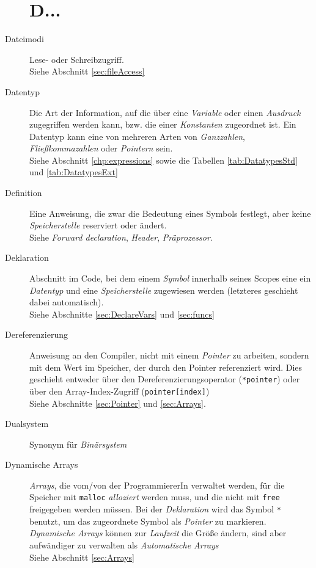 \begin{appendices}
\begin{description}
\section*{D...}
\item[Dateimodi] Lese- oder Schreibzugriff.\\
	Siehe Abschnitt \ref{sec:fileAccess}
\item[Datentyp] Die Art der Information, auf die über eine \emph{Variable} oder einen \emph{Ausdruck} 
	zugegriffen werden kann, bzw. die einer \emph{Konstanten} zugeordnet ist. Ein Datentyp kann eine von
	mehreren Arten von \emph{Ganzzahlen}, \emph{Fließkommazahlen} oder \emph{Pointern} sein.\\
	Siehe Abschnitt \ref{chp:expressions} sowie die Tabellen \ref{tab:DatatypesStd} und
	\ref{tab:DatatypesExt}
\item[Definition] Eine Anweisung, die zwar die Bedeutung eines Symbols festlegt, aber keine
	\emph{Speicherstelle} reserviert oder ändert.\\
	Siehe \emph{Forward declaration}, \emph{Header}, \emph{Präprozessor}.
\item[Deklaration] Abschnitt im Code, bei dem einem \emph{Symbol} innerhalb seines Scopes eine
	ein \emph{Datentyp} und eine \emph{Speicherstelle} zugewiesen werden (letzteres geschieht dabei
	automatisch).\\
	Siehe Abschnitte \ref{sec:DeclareVars} und \ref{sec:funcs}
\item[Dereferenzierung] Anweisung an den Compiler, nicht mit einem \emph{Pointer} zu arbeiten, sondern
	mit dem Wert im Speicher, der durch den Pointer referenziert wird. Dies geschieht entweder über den
	Dereferenzierungsoperator (\texttt{*pointer}) oder über den Array-Index-Zugriff
	(\texttt{pointer[index]})\\
	Siehe Abschnitte \ref{sec:Pointer} und \ref{sec:Arrays}.
\item[Dualsystem] Synonym für \emph{Binärsystem}
\item[Dynamische Arrays] \emph{Arrays}, die vom/von der ProgrammiererIn verwaltet werden, \ie für die
	Speicher mit \texttt{malloc} \emph{alloziert} werden muss, und die nicht mit \texttt{free}
	freigegeben werden müssen. Bei der \emph{Deklaration} wird das Symbol \texttt{*} benutzt, um
	das zugeordnete Symbol als \emph{Pointer} zu markieren.\\
	\emph{Dynamische Arrays} können zur \emph{Laufzeit} die Größe ändern, sind aber aufwändiger zu
	verwalten als \emph{Automatische Arrays}\\
	Siehe Abschnitt \ref{sec:Arrays}


\end{description}
\end{appendices}
